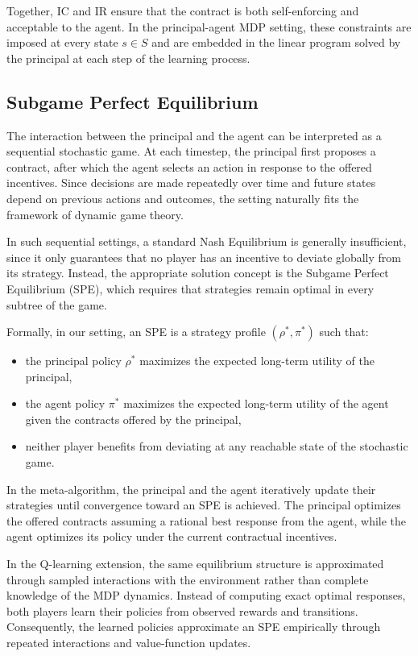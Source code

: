 \documentclass{article}
\theoremstyle{plain}
\theoremstyle{definition}
\theoremstyle{remark}
\begin{document}
Together, IC and IR ensure that the contract is both self-enforcing and acceptable to the agent. In the principal-agent MDP setting, these constraints are imposed at every state $s \in S$ and are embedded in the linear program solved by the principal at each step of the learning process.
\subsection{Subgame Perfect Equilibrium}

The interaction between the principal and the agent can be interpreted as a sequential stochastic game.
At each timestep, the principal first proposes a contract, after which the agent selects an action in response to the offered incentives.
Since decisions are made repeatedly over time and future states depend on previous actions and outcomes, the setting naturally fits the framework of dynamic game theory.

In such sequential settings, a standard Nash Equilibrium is generally insufficient, since it only guarantees that no player has an incentive to deviate globally from its strategy.
Instead, the appropriate solution concept is the Subgame Perfect Equilibrium (SPE), which requires that strategies remain optimal in every subtree of the game.

Formally, in our setting, an SPE is a strategy profile $(\rho^*, \pi^*)$ such that:
\begin{itemize}
    \item the principal policy $\rho^*$ maximizes the expected long-term utility of the principal,
    \item the agent policy $\pi^*$ maximizes the expected long-term utility of the agent given the contracts offered by the principal,
    \item neither player benefits from deviating at any reachable state of the stochastic game.
\end{itemize}

In the meta-algorithm, the principal and the agent iteratively update their strategies until convergence toward an SPE is achieved.
The principal optimizes the offered contracts assuming a rational best response from the agent, while the agent optimizes its policy under the current contractual incentives.

In the Q-learning extension, the same equilibrium structure is approximated through sampled interactions with the environment rather than complete knowledge of the MDP dynamics.
Instead of computing exact optimal responses, both players learn their policies from observed rewards and transitions.
Consequently, the learned policies approximate an SPE empirically through repeated interactions and value-function updates.
\end{document}
